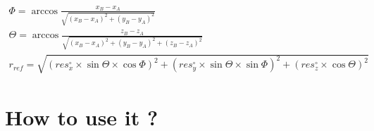 \documentclass[a4paper, 11pt]{report}%
\begin{document}
\begin{enumerate*}
	\begin{eqnarray}
		\Phi=\arccos\frac{x_{B}-x_{A}}{\sqrt{(x_{B}-x_{A})^2+(y_{B}-y_{A})^2}}\label{eqn:gcoar-phi}\\
		\Theta=\arccos\frac{z_{B}-z_{A}}{\sqrt{(x_{B}-x_{A})^2+(y_{B}-y_{A})^2+(z_{B}-z_{A})^2}}\label{eqn:gcoar-theta}\\
		r_{ref}=\sqrt{(res^\circ_{x}\times\sin\Theta\times\cos\Phi )^2+(res^\circ_{y}\times\sin\Theta\times\sin\Phi)^2+(res^\circ_{z}\times\cos\Theta)^2}\label{eqn:gcoar-refDist}
	\end{eqnarray}
	
\end{enumerate*}

\section{How to use it ?}
\label{sec:gcoar-how}
\end{document}
